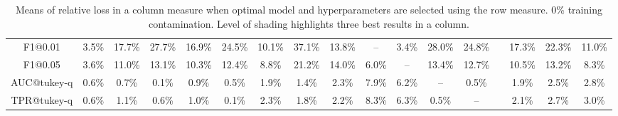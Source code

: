 \begin{table*}
{\begin{tabular}[h]{c c c c c c c c c c c c c c c c c }
  F1@0.01 & 3.5\% & 17.7\% & 27.7\% & 16.9\% & 24.5\% & 10.1\% & 37.1\% & 13.8\% & -- & \cellcolor{gray!45}3.4\% & 28.0\% & 24.8\% &  & 17.3\% & 22.3\% & 11.0\%  \\ 
  F1@0.05 & 3.6\% & 11.0\% & 13.1\% & 10.3\% & 12.4\% & 8.8\% & 21.2\% & 14.0\% & \cellcolor{gray!45}6.0\% & -- & 13.4\% & 12.7\% &  & 10.5\% & 13.2\% & 8.3\%  \\ 
  AUC@tukey-q & 0.6\% & 0.7\% & \cellcolor{gray!45}0.1\% & \cellcolor{gray!30}0.9\% & \cellcolor{gray!30}0.5\% & 1.9\% & \cellcolor{gray!45}1.4\% & 2.3\% & \cellcolor{gray!15}7.9\% & 6.2\% & -- & \cellcolor{gray!30}0.5\% &  & \cellcolor{gray!30}1.9\% & \cellcolor{gray!30}2.5\% & 2.8\%  \\ 
  TPR@tukey-q & 0.6\% & 1.1\% & \cellcolor{gray!15}0.6\% & 1.0\% & \cellcolor{gray!45}0.1\% & 2.3\% & 1.8\% & 2.2\% & 8.3\% & 6.3\% & \cellcolor{gray!30}0.5\% & -- &  & 2.1\% & 2.7\% & 3.0\%  \\ 
 \end{tabular}
 }
 \caption{Means of relative loss in a column measure when optimal model and hyperparameters are selected using the row measure. 0\%  training contamination. Level of shading highlights three best results in a column.} 
 \label{tab:measure_comparison_full_0_by_models_tukey_q} 
\end{table*}